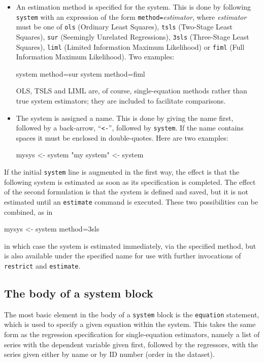 \begin{itemize}
\item An estimation method is specified for the system. This is done
  by following \texttt{system} with an expression of the form
  \texttt{method=}\textsl{estimator}, where \textsl{estimator} must be
  one of \texttt{ols} (Ordinary Least Squares), \texttt{tsls}
  (Two-Stage Least Squares), \texttt{sur} (Seemingly Unrelated
  Regressions), \texttt{3sls} (Three-Stage Least Squares),
  \texttt{liml} (Limited Information Maximum Likelihood) or
  \texttt{fiml} (Full Information Maximum Likelihood). Two examples:
\begin{code}
system method=sur
system method=fiml
\end{code}
OLS, TSLS and LIML are, of course, single-equation methods rather than
true system estimators; they are included to facilitate comparisons.
\item The system is assigned a name. This is done by giving the name
  first, followed by a back-arrow, ``\verb|<-|'', followed by
  \texttt{system}.  If the name contains spaces it must be enclosed in
  double-quotes. Here are two examples:
\begin{code}
mysys <- system
"my system" <- system
\end{code}
\end{itemize}

If the initial \texttt{system} line is augmented in the first way, the
effect is that the following system is estimated as soon as its
specification is completed. The effect of the second formulation is
that the system is defined and saved, but it is not estimated until an
\texttt{estimate} command is executed. These two possibilities can be
combined, as in
\begin{code}
mysys <- system method=3sls
\end{code}
in which case the system is estimated immediately, via the specified
method, but is also available under the specified name for use with
further invocations of \texttt{restrict} and \texttt{estimate}.

\subsection{The body of a system block}

The most basic element in the body of a \texttt{system} block is the
\texttt{equation} statement, which is used to specify a given equation
within the system. This takes the same form as the regression
specification for single-equation estimators, namely a list of series
with the dependent variable given first, followed by the regressors,
with the series given either by name or by ID number (order in the
dataset).

